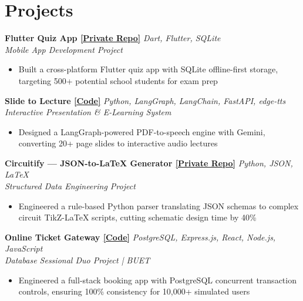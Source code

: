 \documentclass[letterpaper,11pt]{article}
\newcommand{\cvproject}[3]{%
  \noindent
  \textbf{#1} \hfill \textit{#2} \\
  \textit{#3}
}
\begin{document}
\vspace{6pt}

\section{Projects}

\cvproject
  {Flutter Quiz App \href{https://github.com/rishofficial}{\small[Private Repo]}}
  {Dart, Flutter, SQLite}
  {Mobile App Development Project}
\begin{itemize}[leftmargin=*, noitemsep, topsep=1pt, parsep=0pt]
  \item Built a cross-platform Flutter quiz app with SQLite offline-first storage, targeting 500+ potential school students for exam prep
\end{itemize}

\vspace{4pt}

\cvproject
  {Slide to Lecture \href{https://github.com/rishofficial/slide_to_lecture}{\small[Code]}}
  {Python, LangGraph, LangChain, FastAPI, edge-tts}
  {Interactive Presentation \& E-Learning System}
\begin{itemize}[leftmargin=*, noitemsep, topsep=1pt, parsep=0pt]
  \item Designed a LangGraph-powered PDF-to-speech engine with Gemini, converting 20+ page slides to interactive audio lectures
\end{itemize}

\vspace{4pt}

\cvproject
  {Circuitify — JSON-to-LaTeX Generator \href{https://github.com/rishofficial}{\small[Private Repo]}}
  {Python, JSON, LaTeX}
  {Structured Data Engineering Project}
\begin{itemize}[leftmargin=*, noitemsep, topsep=1pt, parsep=0pt]
  \item Engineered a rule-based Python parser translating JSON schemas to complex circuit TikZ-LaTeX scripts, cutting schematic design time by 40\%
\end{itemize}

\vspace{4pt}

\cvproject
  {Online Ticket Gateway \href{https://github.com/rishofficial/Online-ticket-gateway}{\small[Code]}}
  {PostgreSQL, Express.js, React, Node.js, JavaScript}
  {Database Sessional Duo Project | BUET}
\begin{itemize}[leftmargin=*, noitemsep, topsep=1pt, parsep=0pt]
  \item Engineered a full-stack booking app with PostgreSQL concurrent transaction controls, ensuring 100\% consistency for 10,000+ simulated users
\end{itemize}
\end{document}
